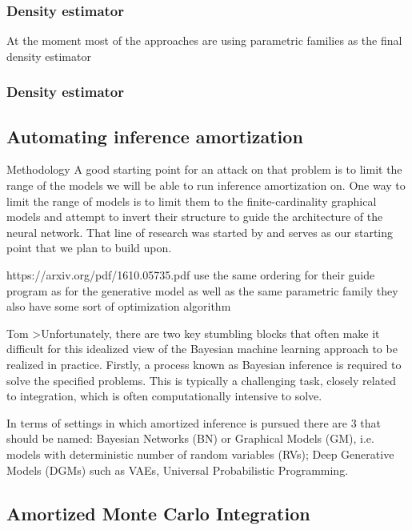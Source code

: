 \documentclass[12pt]{article}
\begin{document}

\subsubsection*{Density estimator}
At the moment most of the approaches are using parametric families as the final density estimator

\subsubsection*{Density estimator}




\subsection{Automating inference amortization}
Methodology
A good starting point for an attack on that problem is to limit the range of the models we will be able to run inference amortization on. One way to limit the range of models is to limit them to the finite-cardinality graphical models and attempt to invert their structure to guide the architecture of the neural network. That line of research was started by \citet{PaigeWood2016} and serves as our starting point that we plan to build upon.


https://arxiv.org/pdf/1610.05735.pdf use the same ordering for their guide program as for the generative model as well as the same parametric family
they also have some sort of optimization algorithm 

Tom
>Unfortunately, there are two key stumbling blocks that often make it difficult for this idealized view of the Bayesian machine learning approach to be realized in practice. Firstly, a process known as Bayesian inference is required to solve the specified problems. This is typically a challenging task, closely related to integration, which is often computationally intensive to solve.

In terms of settings in which amortized inference is pursued there are 3 that should be named: 
Bayesian Networks (BN) or Graphical Models (GM), i.e. models with deterministic number of random variables (RVs); 
Deep Generative Models (DGMs) such as VAEs,
Universal Probabilistic Programming.

\subsection{Amortized Monte Carlo Integration}
\end{document}
